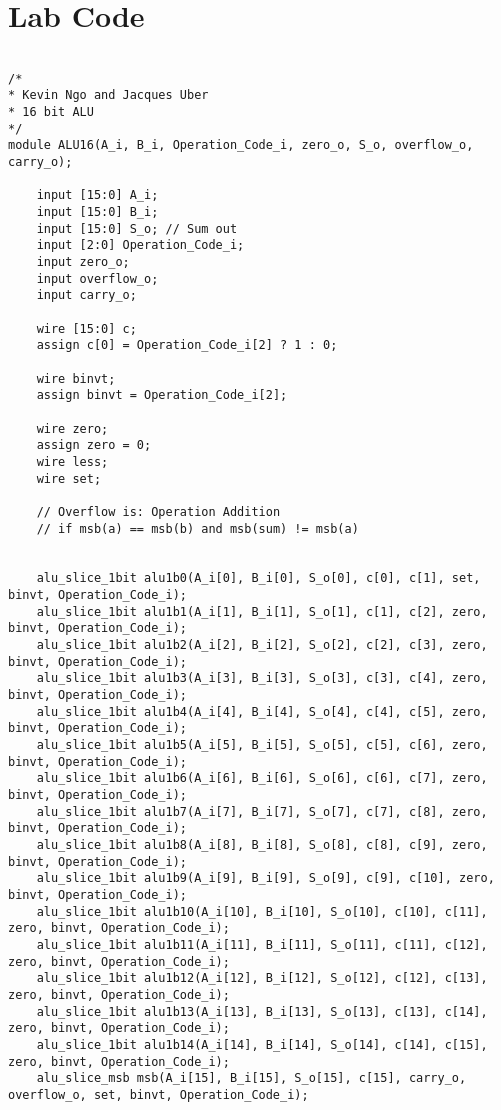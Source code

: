 \documentclass[12pt]{article}
\begin{document}
\section{Lab Code}
    {\tiny
    \begin{verbatim}

/*
* Kevin Ngo and Jacques Uber
* 16 bit ALU
*/
module ALU16(A_i, B_i, Operation_Code_i, zero_o, S_o, overflow_o, carry_o);

    input [15:0] A_i;
    input [15:0] B_i;
    input [15:0] S_o; // Sum out
    input [2:0] Operation_Code_i;
    input zero_o;
    input overflow_o;
    input carry_o;

    wire [15:0] c;
    assign c[0] = Operation_Code_i[2] ? 1 : 0;

    wire binvt;
    assign binvt = Operation_Code_i[2];

    wire zero;
    assign zero = 0;
    wire less;
    wire set;
    
    // Overflow is: Operation Addition
    // if msb(a) == msb(b) and msb(sum) != msb(a)


    alu_slice_1bit alu1b0(A_i[0], B_i[0], S_o[0], c[0], c[1], set, binvt, Operation_Code_i);
    alu_slice_1bit alu1b1(A_i[1], B_i[1], S_o[1], c[1], c[2], zero, binvt, Operation_Code_i);
    alu_slice_1bit alu1b2(A_i[2], B_i[2], S_o[2], c[2], c[3], zero, binvt, Operation_Code_i);
    alu_slice_1bit alu1b3(A_i[3], B_i[3], S_o[3], c[3], c[4], zero, binvt, Operation_Code_i);
    alu_slice_1bit alu1b4(A_i[4], B_i[4], S_o[4], c[4], c[5], zero, binvt, Operation_Code_i);
    alu_slice_1bit alu1b5(A_i[5], B_i[5], S_o[5], c[5], c[6], zero, binvt, Operation_Code_i);
    alu_slice_1bit alu1b6(A_i[6], B_i[6], S_o[6], c[6], c[7], zero, binvt, Operation_Code_i);
    alu_slice_1bit alu1b7(A_i[7], B_i[7], S_o[7], c[7], c[8], zero, binvt, Operation_Code_i);
    alu_slice_1bit alu1b8(A_i[8], B_i[8], S_o[8], c[8], c[9], zero, binvt, Operation_Code_i);
    alu_slice_1bit alu1b9(A_i[9], B_i[9], S_o[9], c[9], c[10], zero, binvt, Operation_Code_i);
    alu_slice_1bit alu1b10(A_i[10], B_i[10], S_o[10], c[10], c[11], zero, binvt, Operation_Code_i);
    alu_slice_1bit alu1b11(A_i[11], B_i[11], S_o[11], c[11], c[12], zero, binvt, Operation_Code_i);
    alu_slice_1bit alu1b12(A_i[12], B_i[12], S_o[12], c[12], c[13], zero, binvt, Operation_Code_i);
    alu_slice_1bit alu1b13(A_i[13], B_i[13], S_o[13], c[13], c[14], zero, binvt, Operation_Code_i);
    alu_slice_1bit alu1b14(A_i[14], B_i[14], S_o[14], c[14], c[15], zero, binvt, Operation_Code_i);
    alu_slice_msb msb(A_i[15], B_i[15], S_o[15], c[15], carry_o, overflow_o, set, binvt, Operation_Code_i);


\end{verbatim}}
\end{document}
